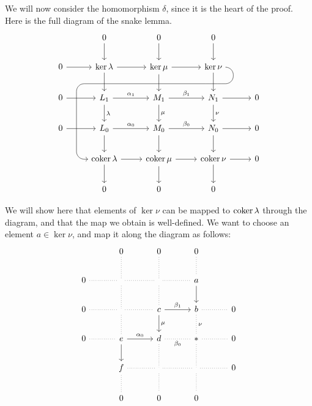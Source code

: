 We will now consider the homomorphism $\delta $, since it is the heart of the proof. Here is the full diagram of the snake lemma.
\[\begin{tikzcd}[row sep=2em, column sep=2.5em]
	&0\arrow[d]&0\arrow[d]&0\arrow[d]\\
	0\arrow[r]&\ker \lambda \arrow[r]\arrow[d]&\ker \mu \arrow[r]\arrow[d]&\ker \nu \arrow[d]\arrow[dddll, rounded corners=9, to path={
    -- ([xshift=2ex]\tikztostart.east)
    |- ([yshift=-3ex]\tikztostart.south)
    -| ([xshift=-3ex]\tikztotarget.west)
    -- ([xshift=-9ex]\tikztotarget.east)
	}]\\
	0\arrow[r]&L_1\arrow[r, "\alpha _1"]\arrow[d, "\lambda "]&M_1\arrow[r, "\beta _1"]\arrow[d, "\mu "]&N_1\arrow[r]\arrow[d, "\nu "]&0\\
	0\arrow[r]&L_0\arrow[r, "\alpha _0"]\arrow[d]&M_0\arrow[r, "\beta _0"]\arrow[d]&N_0\arrow[r]\arrow[d]&0\\
		  &\coker \lambda \arrow[r]\arrow[d]&\coker \mu \arrow[r]\arrow[d]&\coker \nu \arrow[r]\arrow[d]&0\\
	&0&0&0
\end{tikzcd}\]

We will show here that elements of $\ker \nu $ can be mapped to $\operatorname{coker} \lambda $ through the diagram, and that the map we obtain is well-defined. We want to choose an element $a\in \ker \nu $, and map it along the diagram as follows:
\[\begin{tikzcd}[row sep=2em, column sep=3em]
	&0\arrow[d, dotted, no head]&0\arrow[d, dotted, no head]&0\arrow[d, dotted, no head]\\
	0\arrow[r, dotted, no head]&\arrow[r, dotted, no head]\arrow[d, dotted, no head]&\arrow[d,  dotted, no head]\arrow[r, dotted, no head]&a\arrow[d]\\
	0\arrow[r, dotted, no head]&\arrow[r, dotted, no head]\arrow[d, dotted, no head]&c\arrow[r, "\beta _1"]\arrow[d, "\mu "]&b\arrow[r, dotted, no head]\arrow[d, dotted, no head, "\nu "]&0\\
	0\arrow[r, dotted, no head]&e\arrow[r, "\alpha _0"]\arrow[d]&d\arrow[d, dotted, no head]\arrow[r, dotted, no head, "\beta _0"']&*\arrow[r, dotted, no head]\arrow[d, dotted, no head]&0\\
				   &f\arrow[r, dotted, no head]\arrow[d, dotted, no head]&\arrow[r, dotted, no head]\arrow[d, dotted, no head]&\arrow[r, dotted, no head]\arrow[d, dotted, no head]&0\\
				   &0&0&0
\end{tikzcd}\]

